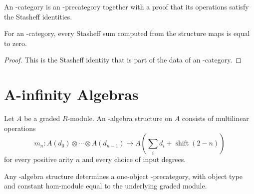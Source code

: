 \begin{definition}
\label{AInfinityTheory.AInfinityCategory}
\leanok
{}
An \Ainf{}-category is an \Ainf{}-precategory together with a proof that its
operations satisfy the Stasheff identities.
\end{definition}

\begin{lemma}
\label{AInfinityTheory.AInfinityCategory.indexedStasheffSum_eq_zero}
\leanok
{}
For an \Ainf{}-category, every Stasheff sum computed from the structure maps is
equal to zero.
\end{lemma}
\begin{proof}
\leanok
This is the Stasheff identity that is part of the data of an \Ainf{}-category.
\end{proof}



\chapter{A-infinity Algebras}

\begin{definition}
\label{AInfinityAlgebraTheory.AInfinityAlgStruct}
{}
Let $A$ be a graded $R$-module. An \Ainf{}-algebra structure on $A$ consists of
multilinear operations
\[
  m_n : A(d_0) \otimes \cdots \otimes A(d_{n-1})
    \to A\!\left(\sum_i d_i + \operatorname{shift}(2 - n)\right)
\]
for every positive arity $n$ and every choice of input degrees.
\end{definition}

\begin{definition}
\label{AInfinityAlgebraTheory.AInfinityAlgStruct.toPreCategory}
{}
Any \Ainf{}-algebra structure determines a one-object \Ainf{}-precategory, with
object type  and constant hom-module equal to the underlying graded
module.
\end{definition}

